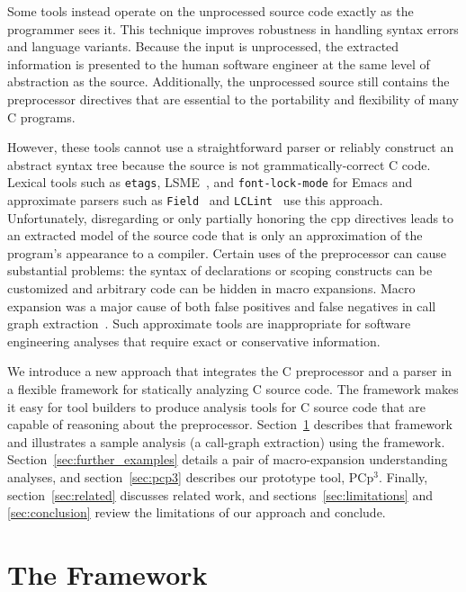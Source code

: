 \documentclass{article}
\newcommand{\pcp}{\mbox{\textsf{PCp}$^3$}}
\newcommand{\Cpp}{\mbox{\textsf{cpp}}}
\newcommand{\C}{\mbox{C}}
\begin{document}
Some tools instead operate on the
unprocessed source code exactly as the programmer sees it.  This
technique improves robustness in handling syntax errors
and language variants. Because the input is unprocessed, the extracted
information is presented to the human software engineer at the same
level of abstraction as the source.  Additionally, the unprocessed
source still contains the preprocessor directives that are essential
to the portability and flexibility of many \C{} programs.

However, these tools cannot use a straightforward parser or reliably construct an
abstract syntax tree because the source is not
grammatically-correct \C{} code.  Lexical tools such as \texttt{etags},
LSME~\cite{Murphy96}, and \texttt{font-lock-mode} for Emacs and
approximate parsers such as \texttt{Field}~\cite{ReissField} and
\texttt{LCLint}~\cite{LCLint} use this approach.  Unfortunately,
disregarding or only partially honoring the \Cpp{} directives leads to
an extracted model of the source code that is only an approximation of
the program's appearance to a compiler.  Certain uses of the
preprocessor can cause substantial problems:  the syntax of declarations 
or scoping constructs can be customized and arbitrary code can be hidden in macro
expansions.  Macro expansion was a
major cause of both false positives and false negatives in call graph
extraction~\cite{Griswold96}.  Such approximate tools are inappropriate
for software engineering analyses that require exact or conservative
information.

We introduce a new approach that integrates the \C{} preprocessor and a
parser in a flexible framework for statically analyzing \C{}
source code.  The framework makes it easy for tool builders to produce
analysis tools for \C{} source code that are capable of reasoning about the
preprocessor.  Section~\ref{sec:framework} describes that framework and
illustrates a sample analysis (a call-graph extraction) using the
framework.  Section~\ref{sec:further_examples} details a pair of
macro-expansion understanding analyses, and section~\ref{sec:pcp3} describes our
prototype tool, \pcp{}. Finally, section~\ref{sec:related} discusses
related work, and sections~\ref{sec:limitations} and \ref{sec:conclusion}
review the limitations of our approach and conclude.

\section{The Framework}
\label{sec:framework}
\end{document}
